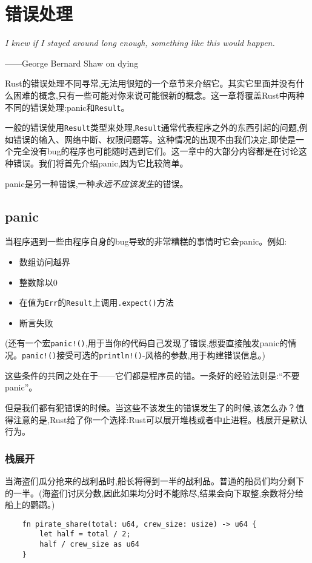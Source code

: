\chapter{错误处理}\label{ch07}

\emph{I knew if I stayed around long enough, something like this would happen.}

\begin{flushright}
    ——George Bernard Shaw on dying
\end{flushright}

Rust的错误处理不同寻常,无法用很短的一个章节来介绍它。其实它里面并没有什么困难的概念,只有一些可能对你来说可能很新的概念。这一章将覆盖Rust中两种不同的错误处理:panic和\texttt{Result}。

一般的错误使用\texttt{Result}类型来处理,\texttt{Result}通常代表程序之外的东西引起的问题,例如错误的输入、网络中断、权限问题等。这种情况的出现不由我们决定,即使是一个完全没有bug的程序也可能随时遇到它们。这一章中的大部分内容都是在讨论这种错误。我们将首先介绍panic,因为它比较简单。

panic是另一种错误,一种\emph{永远不应该发生}的错误。

\section{panic}

当程序遇到一些由程序自身的bug导致的非常糟糕的事情时它会panic。例如:
\begin{itemize}
    \item 数组访问越界
    \item 整数除以0
    \item 在值为\texttt{Err}的\texttt{Result}上调用\texttt{.expect()}方法
    \item 断言失败
\end{itemize}

(还有一个宏\texttt{panic!()},用于当你的代码自己发现了错误,想要直接触发panic的情况。\texttt{panic!()}接受可选的\texttt{println!()}-风格的参数,用于构建错误信息。)

这些条件的共同之处在于——它们都是程序员的错。一条好的经验法则是:“不要panic”。

但是我们都有犯错误的时候。当这些不该发生的错误发生了的时候,该怎么办？值得注意的是,Rust给了你一个选择:Rust可以展开堆栈或者中止进程。栈展开是默认行为。

\subsection{栈展开}\label{unwind}
当海盗们瓜分抢来的战利品时,船长将得到一半的战利品。普通的船员们均分剩下的一半。(海盗们讨厌分数,因此如果均分时不能除尽,结果会向下取整,余数将分给船上的鹦鹉。)
\begin{verbatim}
    fn pirate_share(total: u64, crew_size: usize) -> u64 {
        let half = total / 2;
        half / crew_size as u64
    }
\end{verbatim}

